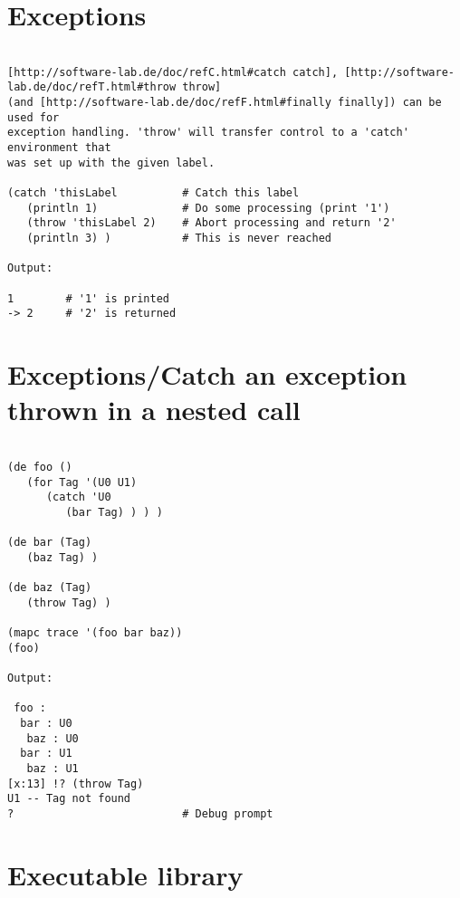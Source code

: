\section*{Exceptions}

\begin{verbatim}

[http://software-lab.de/doc/refC.html#catch catch], [http://software-lab.de/doc/refT.html#throw throw]
(and [http://software-lab.de/doc/refF.html#finally finally]) can be used for
exception handling. 'throw' will transfer control to a 'catch' environment that
was set up with the given label.

(catch 'thisLabel          # Catch this label
   (println 1)             # Do some processing (print '1')
   (throw 'thisLabel 2)    # Abort processing and return '2'
   (println 3) )           # This is never reached

Output:

1        # '1' is printed
-> 2     # '2' is returned

\end{verbatim}

\section*{Exceptions/Catch an exception thrown in a nested call}

\begin{verbatim}

(de foo ()
   (for Tag '(U0 U1)
      (catch 'U0
         (bar Tag) ) ) )

(de bar (Tag)
   (baz Tag) )

(de baz (Tag)
   (throw Tag) )

(mapc trace '(foo bar baz))
(foo)

Output:

 foo :
  bar : U0
   baz : U0
  bar : U1
   baz : U1
[x:13] !? (throw Tag)
U1 -- Tag not found
?                          # Debug prompt

\end{verbatim}

\section*{Executable library}

